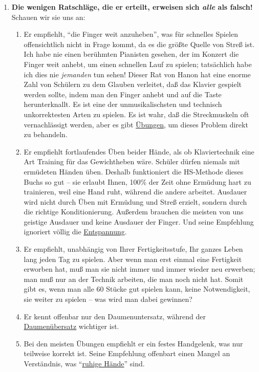 \begin{enumerate}[label={\roman*.}]
\item \label{c1iii7h7}\textbf{Die wenigen Ratschläge, die er erteilt, erweisen sich \textit{alle} als falsch!}
Schauen wir sie uns an:

\begin{enumerate}[label={\alph*)}] 
\item Er empfiehlt, \enquote{die Finger weit anzuheben}, was für schnelles Spielen offensichtlich nicht in Frage kommt, da es die größte Quelle von Streß ist.
Ich habe nie einen berühmten Pianisten gesehen, der im Konzert die Finger weit anhebt, um einen schnellen Lauf zu spielen; tatsächlich habe ich dies nie \textit{jemanden} tun sehen!
Dieser Rat von Hanon hat eine enorme Zahl von Schülern zu dem Glauben verleitet, daß das Klavier gespielt werden sollte, indem man den Finger anhebt und auf die Taste herunterknallt.
Es ist eine der unmusikalischsten und technisch unkorrektesten Arten zu spielen.
Es ist wahr, daß die Streckmuskeln oft vernachlässigt werden, aber es gibt \hyperref[c1iii7finger]{Übungen}, um dieses Problem direkt zu behandeln.

\item Er empfiehlt fortlaufendes Üben beider Hände, als ob Klaviertechnik eine Art Training für das Gewichtheben wäre.
Schüler dürfen niemals mit ermüdeten Händen üben.
Deshalb funktioniert die HS-Methode dieses Buchs so gut -- sie erlaubt Ihnen, 100\% der Zeit ohne Ermüdung hart zu trainieren, weil eine Hand ruht, während die andere arbeitet.
Ausdauer wird nicht durch Üben mit Ermüdung und Streß erzielt, sondern durch die richtige Konditionierung.
Außerdem brauchen die meisten von uns geistige Ausdauer und keine Ausdauer der Finger.
Und seine Empfehlung ignoriert völlig die \hyperref[c1ii14]{Entspannung}.

\item Er empfiehlt, unabhängig von Ihrer Fertigkeitsstufe, Ihr ganzes Leben lang jeden Tag zu spielen.
Aber wenn man erst einmal eine Fertigkeit erworben hat, muß man sie nicht immer und immer wieder neu erwerben; man muß nur an der Technik arbeiten, die man noch nicht hat.
Somit gibt es, wenn man alle 60 Stücke gut spielen kann, keine Notwendigkeit, sie weiter zu spielen -- was wird man dabei gewinnen?

\item Er kennt offenbar nur den Daumenuntersatz, während der \hyperref[c1iii5a]{Daumenübersatz} wichtiger ist.

\item Bei den meisten Übungen empfiehlt er ein festes Handgelenk, was nur teilweise korrekt ist.
Seine Empfehlung offenbart einen Mangel an Verständnis, was \enquote{\hyperref[ruhig]{ruhige Hände}} sind.


\end{enumerate}
\end{enumerate}
